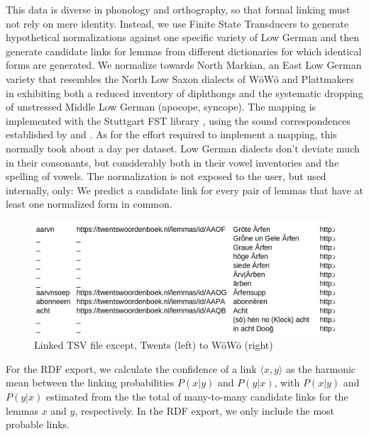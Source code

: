 This data is diverse in phonology and orthography, so that formal linking must not rely on mere identity. Instead, we use Finite State Transducers to generate hypothetical normalizations against one specific variety of Low German and then generate candidate links for lemmas from different dictionaries for which identical forms are generated. We normalize towards North Markian, an East Low German variety that resembles the North Low Saxon dialects of WöWö and Plattmakers in exhibiting both a reduced inventory of diphthongs and the systematic dropping of unstressed Middle Low German  (apocope, syncope). The mapping is implemented with the Stuttgart FST library \cite{schmid2006programming}, using the sound correspondences established by \cite{pfaff1898vocale,teuchert1907mundart} and \cite{mackel1905mundart}. As for the effort required to implement a mapping, this normally took about a day per dataset. Low German dialects don't deviate much in their consonants, but considerably both in their vowel inventories and the spelling of vowels. The normalization is not exposed to the user, but used internally, only: We predict a candidate link for every pair of lemmas that have at least one normalized form in common.

\begin{figure}
    \centering
    \includegraphics[width=1.0\linewidth]{img/tsv-linked.png}
    \caption{Linked TSV file except, Twents (left) to WöWö (right)}
    \label{fig-twents-woewoe}
\end{figure}

For the RDF export, we calculate the confidence of a link $\langle x,y\rangle$ as the harmonic mean between the linking probabilities $P(x|y)$ and $P(y|x)$, with $P(x|y)$ and $P(y|x)$  estimated from the the total of many-to-many candidate links for the lemmas $x$ and $y$, respectively. In the RDF export, we only include the most probable links. 

